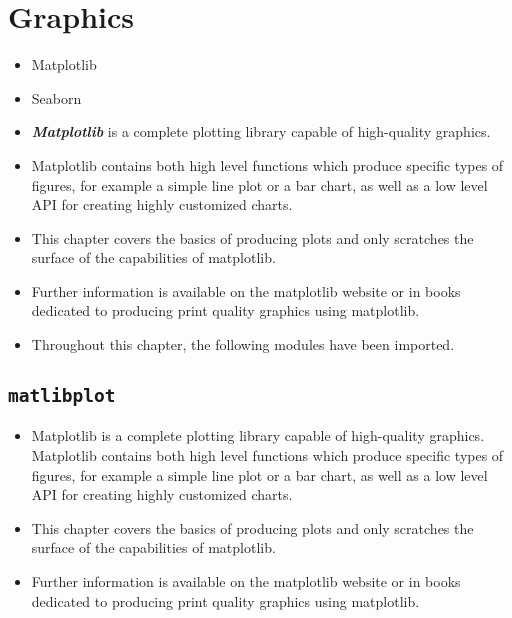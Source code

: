 \documentclass[KSmain.tex]{subfiles}
\begin{document}
 
\newpage
\section{Graphics}

\begin{framed}
\begin{itemize}
\item Matplotlib
\item Seaborn
\end{itemize}
\end{framed}

\begin{itemize}
\item \textit{\textbf{Matplotlib}} is a complete plotting library capable of high-quality graphics. 
\item Matplotlib contains both high
level functions which produce specific types of figures, for example a simple line plot or a bar chart, as
well as a low level API for creating highly customized charts. 
\item This chapter covers the basics of producing
plots and only scratches the surface of the capabilities of matplotlib.
\item  Further information is available on
the matplotlib website or in books dedicated to producing print quality graphics using matplotlib.
\item 
Throughout this chapter, the following modules have been imported.
\end{itemize}

\subsection{\texttt{matlibplot}}
\begin{itemize}
\item Matplotlib is a complete plotting library capable of high-quality graphics. Matplotlib contains both high level functions which produce specific types of figures, for example a simple line plot or a bar chart, as
well as a low level API for creating highly customized charts. 

\item This chapter covers the basics of producing
plots and only scratches the surface of the capabilities of matplotlib. 
\item Further information is available on
the matplotlib website or in books dedicated to producing print quality graphics using matplotlib.
\end{itemize}
\end{document}
